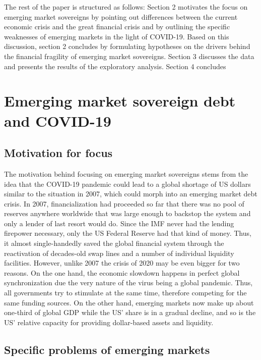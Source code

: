 \documentclass[11pt,]{article}
\begin{document}
The rest of the paper is structured as follows: Section 2 motivates the
focus on emerging market sovereigns by pointing out differences between
the current economic crisis and the great financial crisis and by
outlining the specific weaknesses of emerging markets in the light of
COVID-19. Based on this discussion, section 2 concludes by formulating
hypotheses on the drivers behind the financial fragility of emerging
market sovereigns. Section 3 discusses the data and presents the results
of the exploratory analysis. Section 4 concludes

\hypertarget{emerging-market-sovereign-debt-and-covid-19}{%
\section{Emerging market sovereign debt and
COVID-19}\label{emerging-market-sovereign-debt-and-covid-19}}

\hypertarget{motivation-for-focus}{%
\subsection{Motivation for focus}\label{motivation-for-focus}}

The motivation behind focusing on emerging market sovereigns stems from
the idea that the COVID-19 pandemic could lead to a global shortage of
US dollars similar to the situation in 2007, which could morph into an
emerging market debt crisis. In 2007, financialization had proceeded so
far that there was no pool of reserves anywhere worldwide that was large
enough to backstop the system and only a lender of last resort would do.
Since the IMF never had the lending firepower necessary, only the US
Federal Reserve had that kind of money. Thus, it almost single-handedly
saved the global financial system through the reactivation of
decades-old swap lines and a number of individual liquidity facilities.
However, unlike 2007 the crisis of 2020 may be even bigger for two
reasons. On the one hand, the economic slowdown happens in perfect
global synchronization due the very nature of the virus being a global
pandemic. Thus, all governments try to stimulate at the same time,
therefore competing for the same funding sources. On the other hand,
emerging markets now make up about one-third of global GDP while the US'
share is in a gradual decline, and so is the US' relative capacity for
providing dollar-based assets and liquidity.

\hypertarget{specific-problems-of-emerging-markets}{%
\subsection{Specific problems of emerging
markets}\label{specific-problems-of-emerging-markets}}
\end{document}
